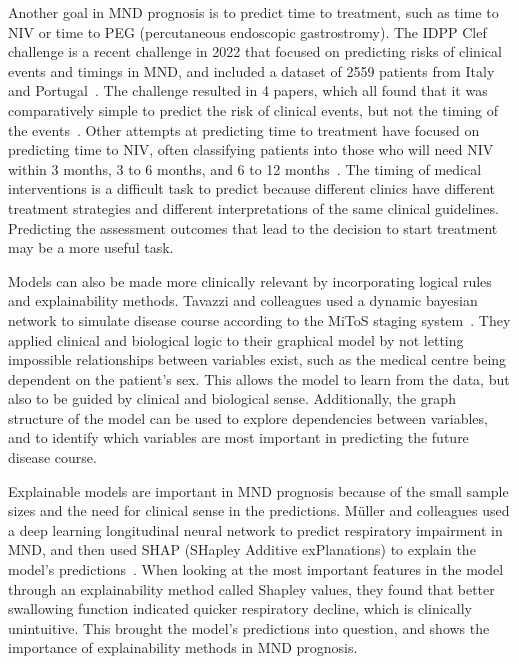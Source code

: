 Another goal in MND prognosis is to predict time to treatment, such as time to NIV or time to PEG (percutaneous endoscopic gastrostromy).
The IDPP Clef challenge is a recent challenge in 2022 that focused on predicting risks of clinical events and timings in MND, and included a dataset of 2559 patients from Italy and Portugal~\cite{guazzoOverviewIDPPCLEF2022}.
The challenge resulted in 4 papers, which all found that it was comparatively simple to predict the risk of clinical events, but not the timing of the events~\cite{brancoHierarchicalModellingALS2022, mannionPredictingRiskTime2022, trescatoBaselineMachineLearning2022, pancottiMultiEventSurvivalPrediction2022}.
Other attempts at predicting time to treatment have focused on predicting time to NIV, often classifying patients into those who will need NIV within 3 months, 3 to 6 months, and 6 to 12 months~\cite{carreiroPrognosticModelsBased2015, pereiraPredictingAssistedVentilation2019}.
The timing of medical interventions is a difficult task to predict because different clinics have different treatment strategies and different interpretations of the same clinical guidelines.
Predicting the assessment outcomes that lead to the decision to start treatment may be a more useful task.

Models can also be made more clinically relevant by incorporating logical rules and explainability methods.
Tavazzi and colleagues used a dynamic bayesian network to simulate disease course according to the MiToS staging system~\cite{tavazziPredictingFunctionalImpairment2022}.
They applied clinical and biological logic to their graphical model by not letting impossible relationships between variables exist, such as the medical centre being dependent on the patient's sex.
This allows the model to learn from the data, but also to be guided by clinical and biological sense.
Additionally, the graph structure of the model can be used to explore dependencies between variables, and to identify which variables are most important in predicting the future disease course.

Explainable models are important in MND prognosis because of the small sample sizes and the need for clinical sense in the predictions.
Müller and colleagues used a deep learning longitudinal neural network to predict respiratory impairment in MND, and then used SHAP (SHapley Additive exPlanations) to explain the model's predictions~\cite{mullerExplainableModelsDisease2021}.
When looking at the most important features in the model through an explainability method called Shapley values, they found that better swallowing function indicated quicker respiratory decline, which is clinically unintuitive.
This brought the model's predictions into question, and shows the importance of explainability methods in MND prognosis.


